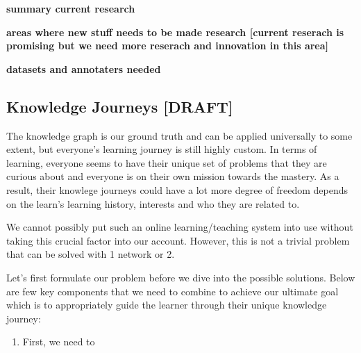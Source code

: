 \documentclass{acm_proc_article-sp}
\renewcommand{\paragraph}[1]{\vskip 6pt\noindent\textbf{#1 }}
\providecommand{\tightlist}{%
  \setlength{\itemsep}{0pt}\setlength{\parskip}{0pt}}
\begin{document}
\paragraph{summary current research}\label{summary-current-research-1}

\paragraph{areas where new stuff needs to be made research {[}current
reserach is promising but we need more reserach and innovation in this
area{]}}\label{areas-where-new-stuff-needs-to-be-made-research-current-reserach-is-promising-but-we-need-more-reserach-and-innovation-in-this-area-1}

\paragraph{datasets and annotaters
needed}\label{datasets-and-annotaters-needed-1}

\subsection{Knowledge Journeys
{[}DRAFT{]}}\label{knowledge-journeys-draft}

The knowledge graph is our ground truth and can be applied universally
to some extent, but everyone's learning journey is still highly custom.
In terms of learning, everyone seems to have their unique set of
problems that they are curious about and everyone is on their own
mission towards the mastery. As a result, their knowlege journeys could
have a lot more degree of freedom depends on the learn's learning
history, interests and who they are related to.

We cannot possibly put such an online learning/teaching system into use
without taking this crucial factor into our account. However, this is
not a trivial problem that can be solved with 1 network or 2.

Let's first formulate our problem before we dive into the possible
solutions. Below are few key components that we need to combine to
achieve our ultimate goal which is to appropriately guide the learner
through their unique knowledge journey:

\begin{enumerate}
\def\labelenumi{\arabic{enumi}.}
\tightlist
\item
  First, we need to
\end{enumerate}
\end{document}
